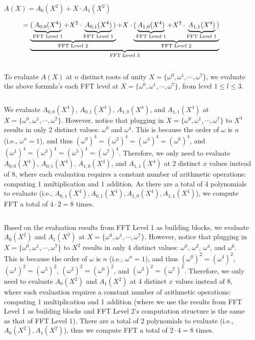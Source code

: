$A(X) = A_0(X^2) + X \cdot A_1(X^2)$

$\mathcolor{white}{A(X)} = \underbrace{\underbrace{(\underbrace{A_{0,0}(X^4)}_{\text{FFT Level 1}} + X^2\cdot \underbrace{A_{0,1}(X^4)}_{\text{FFT Level 1}})}_{\text{FFT Level 2}} + X \cdot \underbrace{(\underbrace{A_{1,0}(X^4)}_{\text{FFT Level 1}} + X^2\cdot \underbrace{A_{1,1}(X^4)}_{\text{FFT Level 1}})}_{\text{FFT Level 2}}}_{\text{FFT Level 3}}$

$ $

To evaluate $A(X)$ at $n$ distinct roots of unity $X = \{\omega^0, \omega^1, \cdots, \omega^7\}$, we evaluate the above formula's each FFT level at $X = \{\omega^0, \omega^1, \cdots, \omega^7\}$, from level $1 \leq l \leq 3$. 

$ $

 We evaluate $A_{0,0}(X^4)$, $A_{0,1}(X^4)$, $A_{1,0}(X^4)$, and $A_{1,1}(X^4)$ at $X = \{\omega^0, \omega^1, \cdots, \omega^7\}$. However, notice that plugging in $X = \{\omega^0, \omega^1, \cdots, \omega^7\}$ to $X^4$ results in only 2 distinct values: $\omega^0$ and $\omega^4$. This is because the order of $\omega$ is $n$ (i.e., $\omega^n = 1$), and thus $(\omega^0)^4 = (\omega^2)^4 = (\omega^4)^4 = (\omega^6)^4$, and $(\omega^1)^4 = (\omega^3)^4 = (\omega^5)^4 = (\omega^7)^4$. Therefore, we only need to evaluate $A_{0,0}(X^4)$, $A_{0,1}(X^4)$, $A_{1,0}(X^4)$, and $A_{1,1}(X^4)$ at 2 distinct $x$ values instead of 8, where each evaluation requires a constant number of arithmetic operations: computing 1 multiplication and 1 addition. As there are a total of 4 polynomials to evaluate (i.e., $A_{0, 1}(X^4), A_{0, 1}(X^4), A_{1, 0}(X^4), A_{1, 1}(X^4)$), we compute FFT a total of $4 \cdot 2 = 8$ times. 

$ $

 Based on the evaluation results from FFT Level 1 as building blocks, we evaluate $A_{0}(X^2)$ and $A_{1}(X^2)$ at $X = \{\omega^0, \omega^1, \cdots, \omega^7\}$. However, notice that plugging in $X = \{\omega^0, \omega^1, \cdots, \omega^7\}$ to $X^2$ results in only 4 distinct values: $\omega^0$, $\omega^2$, $\omega^4$, and $\omega^6$.
This is because the order of $\omega$ is $n$ (i.e., $\omega^n = 1$), and thus $(\omega^0)^2 = (\omega^4)^2$, $(\omega^1)^2 = (\omega^5)^2$, $(\omega^2)^2 = (\omega^6)^2$, and $(\omega^3)^2 = (\omega^7)^2$. Therefore, we only need to evaluate $A_{0}(X^2)$ and $A_{1}(X^2)$ at 4 distinct $x$ values instead of 8, where each evaluation requires a constant number of arithmetic operations: computing 1 multiplication and 1 addition (where we use the results from FFT Level 1 as building blocks and FFT Level 2's computation structure is the same as that of FFT Level 1). There are a total of 2 polynomials to evaluate (i.e., $A_{0}(X^2), A_{1}(X^2)$), thus we compute FFT a total of $2 \cdot 4 = 8$ times. 

